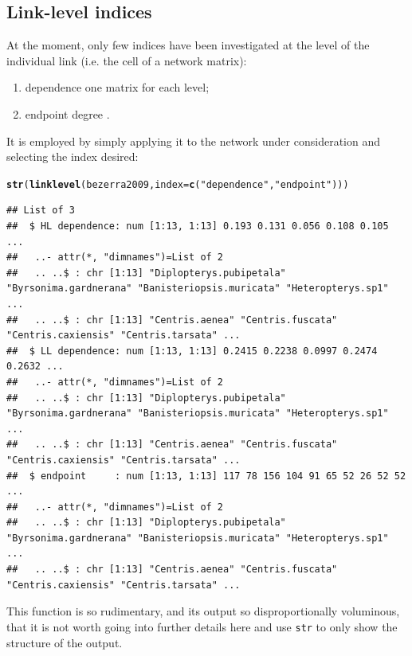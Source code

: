 \documentclass[a4paper, 11pt]{article}\usepackage[]{graphicx}\usepackage[]{color}
\makeatletter
\newcommand{\hlstr}[1]{\textcolor[rgb]{0.192,0.494,0.8}{#1}}%
\newcommand{\hlstd}[1]{\textcolor[rgb]{0.345,0.345,0.345}{#1}}%
\newcommand{\hlkwc}[1]{\textcolor[rgb]{0.333,0.667,0.333}{#1}}%
\newcommand{\hlkwd}[1]{\textcolor[rgb]{0.737,0.353,0.396}{\textbf{#1}}}%
\newenvironment{kframe}{%
 \def\at@end@of@kframe{}%
 \ifinner\ifhmode%
  \def\at@end@of@kframe{\end{minipage}}%
  \begin{minipage}{\columnwidth}%
 \fi\fi%
 \def\FrameCommand##1{\hskip\@totalleftmargin \hskip-\fboxsep
 \colorbox{shadecolor}{##1}\hskip-\fboxsep
     \hskip-\linewidth \hskip-\@totalleftmargin \hskip\columnwidth}%
 \MakeFramed {\advance\hsize-\width
   \@totalleftmargin\z@ \linewidth\hsize
   \@setminipage}}%
 {\par\unskip\endMakeFramed%
 \at@end@of@kframe}
\newenvironment{knitrout}{}{} %
\makeatother
\begin{document}
\subsection{Link-level indices}\label{linklevel}
At the moment, only few indices have been investigated at the level of the individual link (i.e. the cell of a network matrix):
\begin{enumerate}
\item dependence \citep[i.e. the relevance of each species for the other level:][]{Bascompte2006} one matrix for each level;
\item endpoint degree \citep[i.e. product of degrees of species linked by this cell:][]{Barrat2004}.
\end{enumerate}
It is employed by simply applying it to the network under consideration and selecting the index desired:
\begin{knitrout}
\color{fgcolor}\begin{kframe}
\begin{alltt}
\hlkwd{str}\hlstd{(}\hlkwd{linklevel}\hlstd{(bezerra2009,} \hlkwc{index}\hlstd{=}\hlkwd{c}\hlstd{(}\hlstr{"dependence"}\hlstd{,} \hlstr{"endpoint"}\hlstd{)))}
\end{alltt}
\begin{verbatim}
## List of 3
##  $ HL dependence: num [1:13, 1:13] 0.193 0.131 0.056 0.108 0.105 ...
##   ..- attr(*, "dimnames")=List of 2
##   .. ..$ : chr [1:13] "Diplopterys.pubipetala" "Byrsonima.gardnerana" "Banisteriopsis.muricata" "Heteropterys.sp1" ...
##   .. ..$ : chr [1:13] "Centris.aenea" "Centris.fuscata" "Centris.caxiensis" "Centris.tarsata" ...
##  $ LL dependence: num [1:13, 1:13] 0.2415 0.2238 0.0997 0.2474 0.2632 ...
##   ..- attr(*, "dimnames")=List of 2
##   .. ..$ : chr [1:13] "Diplopterys.pubipetala" "Byrsonima.gardnerana" "Banisteriopsis.muricata" "Heteropterys.sp1" ...
##   .. ..$ : chr [1:13] "Centris.aenea" "Centris.fuscata" "Centris.caxiensis" "Centris.tarsata" ...
##  $ endpoint     : num [1:13, 1:13] 117 78 156 104 91 65 52 26 52 52 ...
##   ..- attr(*, "dimnames")=List of 2
##   .. ..$ : chr [1:13] "Diplopterys.pubipetala" "Byrsonima.gardnerana" "Banisteriopsis.muricata" "Heteropterys.sp1" ...
##   .. ..$ : chr [1:13] "Centris.aenea" "Centris.fuscata" "Centris.caxiensis" "Centris.tarsata" ...
\end{verbatim}
\end{kframe}
\end{knitrout}
This function is so rudimentary, and its output so disproportionally voluminous, that it is not worth going into further details here and use \texttt{str} to only show the structure of the output.
\end{document}
